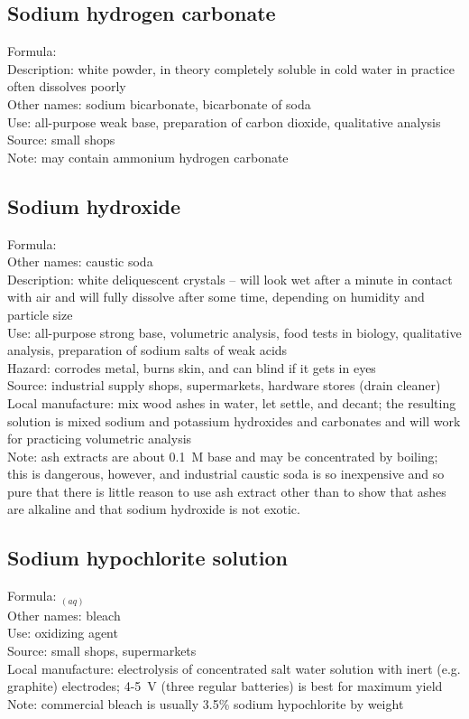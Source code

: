 \subsection{Sodium hydrogen carbonate}
Formula: \\
Description: white powder, 
in theory completely soluble in cold water 
in practice often dissolves poorly\\
Other names: sodium bicarbonate, 
bicarbonate of soda\\
Use: all-purpose weak base, 
preparation of carbon dioxide, 
qualitative analysis\\
Source: small shops \\
Note: may contain ammonium hydrogen carbonate
\subsection{Sodium hydroxide}
Formula: \\
Other names: caustic soda\\
Description: white deliquescent crystals -- 
will look wet after a minute in contact with air 
and will fully dissolve after some time, 
depending on humidity and particle size\\ 
Use: all-purpose strong base, 
volumetric analysis, 
food tests in biology, 
qualitative analysis, 
preparation of sodium salts of weak acids\\
Hazard: corrodes metal, 
burns skin, 
and can blind if it gets in eyes\\
Source: industrial supply shops, 
supermarkets, 
hardware stores (drain cleaner)\\
Local manufacture: mix wood ashes in water, 
let settle, 
and decant; 
the resulting solution is mixed sodium and potassium hydroxides 
and carbonates and will work for practicing volumetric analysis\\
Note: ash extracts are about 0.1~M base and may be concentrated by boiling; 
this is dangerous, 
however, 
and industrial caustic soda is so inexpensive 
and so pure that there is little reason to use ash extract 
other than to show that ashes are alkaline 
and that sodium hydroxide is not exotic.
\subsection{Sodium hypochlorite solution}
Formula: $_{(aq)}$\\
Other names: bleach\\
Use: oxidizing agent\\
Source: small shops, 
supermarkets\\
Local manufacture: electrolysis of concentrated salt water solution 
with inert (e.g. 
graphite) electrodes; 
4-5~V (three regular batteries) is best for maximum yield\\
Note: commercial bleach is usually 3.5\% sodium hypochlorite by weight
